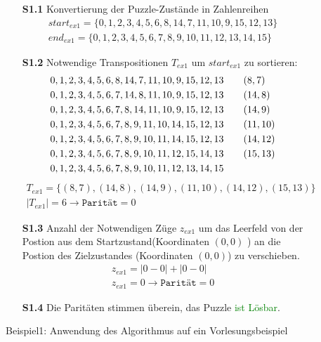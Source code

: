 \begin{figure}[H]
	\begin{enumerate}
		\item[\textbf{S1.1}] Konvertierung der Puzzle-Zustände in Zahlenreihen
		\begin{align*}
		start_{ex1} = \{0,1,2,3,4,5,6,8,14,7,11,10,9,15,12,13\} \\
		end_{ex1} = \{0,1,2,3,4,5,6,7,8,9,10,11,12,13,14,15\}
		\end{align*}
		\item[\textbf{S1.2}] Notwendige Transpositionen $T_{ex1}$ um $start_{ex1}$ zu sortieren:
		\begin{align*}		
		0,1,2,3,4,5,6,8,14,7,11,10,9,15,12,13&\hspace{20pt} (\space 8,\space 7)\\
		0,1,2,3,4,5,6,7,14,8,11,10,9,15,12,13&\hspace{20pt} (14,\space 8)\\
		0,1,2,3,4,5,6,7,8,14,11,10,9,15,12,13&\hspace{20pt} (14,\space 9)\\
		0,1,2,3,4,5,6,7,8,9,11,10,14,15,12,13&\hspace{20pt} (11,10)\\
		0,1,2,3,4,5,6,7,8,9,10,11,14,15,12,13&\hspace{20pt} (14,12)\\
		0,1,2,3,4,5,6,7,8,9,10,11,12,15,14,13&\hspace{20pt} (15,13)\\
		0,1,2,3,4,5,6,7,8,9,10,11,12,13,14,15&
		\end{align*}
		\begin{align*}
		T_{ex1} = \{(8,7),(14,8),(14,9),(11,10),(14,12),(15,13)\}\\
		\left\vert T_{ex1}\right\vert = 6 \rightarrow \texttt{Parität} = 0	
		\end{align*}
		\item[\textbf{S1.3}] Anzahl der Notwendigen Züge $z_{ex1}$ um das Leerfeld von der Postion aus dem Startzustand(Koordinaten $(0,0)$ ) an die Postion des Zielzustandes (Koordinaten $(0,0)$) zu verschieben.
		\begin{align*}		
		z_{ex1} = \left | 0 - 0 \right | + \left | 0 - 0 \right |\\
		z_{ex1} = 0 \rightarrow \texttt{Parität} = 0
		\end{align*}	
		\item[\textbf{S1.4}] Die Paritäten stimmen überein, das Puzzle \textcolor{green}{ist Lösbar}.	
	\end{enumerate}
	\caption{Beispiel1: Anwendung des Algorithmus auf ein Vorlesungsbeispiel \label{fig:Ex1_algo}}
\end{figure}
